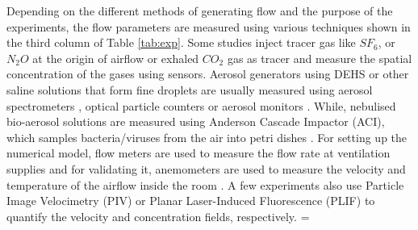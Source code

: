 \documentclass[a4paper,12pt]{elsarticle}
\begin{document}
Depending on the different methods of generating flow and the purpose of the experiments, the flow parameters are measured using various techniques shown in the third column of Table \ref{tab:exp}. Some studies inject tracer gas like $SF_6$, or $N_2O$ at the origin of airflow \cite{qian2008dispersion, cheng2021experimental} or exhaled $CO_2$ gas as tracer \cite{deng2021control} and measure the spatial concentration of the gases using sensors. Aerosol generators using DEHS or other saline solutions that form fine droplets are usually measured using aerosol spectrometers \cite{duill2021impact}, optical particle counters \cite{berrouk2010experimental} or aerosol monitors \cite{zhou2021experimental}. While, nebulised bio-aerosol solutions are measured using Anderson Cascade Impactor (ACI), which samples bacteria/viruses from the air into petri dishes \cite{liu2020full,liu2020experimental}. For setting up the numerical model, flow meters are used to measure the flow rate at ventilation supplies \cite{li2005role,liu2023estimating} and for validating it, anemometers are used to measure the velocity and temperature of the airflow inside the room \cite{li2023numerical,arpino2023cfd}. A few experiments also use Particle Image Velocimetry (PIV) \cite{faleiros2022tu} or Planar Laser-Induced Fluorescence (PLIF) \cite{poussou2010flow} to quantify the velocity and concentration fields, respectively.
\LTcapwidth=\textwidth
\end{document}

